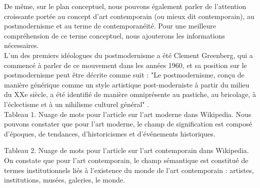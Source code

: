 \documentclass[a4paper, twoside, 12pt]{book}
\begin{document}
De même, sur le plan conceptuel, nous pouvons également parler de l'attention croissante portée au concept d'art contemporain (ou mieux dit contemporain), au postmodernisme et au terme de contemporanéité. Pour une meilleure compréhension de ce terme conceptuel, nous ajouterons les informations nécessaires. \\

L'un des premiers idéologues du postmodernisme a été Clement Greenberg\cite{Moser,2020}, qui a commencé à parler de ce mouvement dans les années 1960, et sa position sur le postmodernisme peut être décrite comme suit : "Le postmodernisme, conçu de manière générique comme un style artistique post-moderniste à partir du milieu du XXe siècle, a été identifié de manière omniprésente au pastiche, au bricolage, à l'éclectisme et à un nihilisme culturel général" .\\

Tableau 1. Nuage de mots pour l'article sur l'art moderne dans Wikipedia. Nous pouvons constater que pour l'art moderne, le champ de signification est composé d'époques, de tendances, d'historicismes et d'événements historiques.

Tableau 2. Nuage de mots pour l'article sur l'art contemporain dans Wikipedia. On constate que pour l'art contemporain, le champ sémantique est constitué de termes institutionnels liés à l'existence du monde de l'art contemporain : artistes, institutions, musées, galeries, le monde. 
\end{document}
